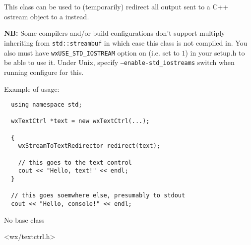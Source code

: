 
\section{}\label{wxstreamtotextredirector}

This class can be used to (temporarily) redirect all output sent to a C++
ostream object to a  instead.

{\bf NB:} Some compilers and/or build configurations don't support multiply
inheriting  from {\tt std::streambuf} in which
case this class is not compiled in. You also must have {\tt wxUSE\_STD\_IOSTREAM} 
option on (i.e. set to $1$) in your setup.h to be able to use it. Under Unix,
specify {\tt --enable-std\_iostreams} switch when running configure for this.

Example of usage:
{\small%
\begin{verbatim}
  using namespace std;

  wxTextCtrl *text = new wxTextCtrl(...);

  {
    wxStreamToTextRedirector redirect(text);

    // this goes to the text control
    cout << "Hello, text!" << endl;
  }

  // this goes soemwhere else, presumably to stdout
  cout << "Hello, console!" << endl;
\end{verbatim}
}%


No base class


<wx/textctrl.h>




\label{wxstreamtotextredirectorctor}


